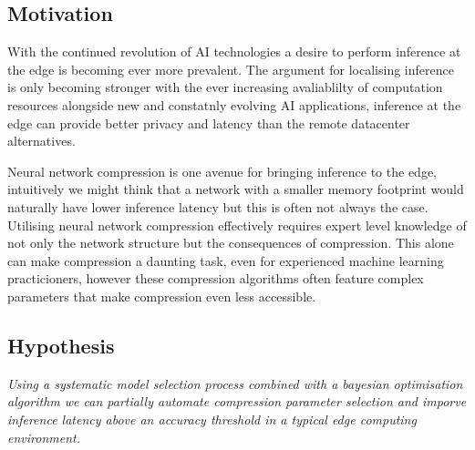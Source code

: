\documentclass[../D1.tex]{subfiles}
\begin{document}
\subsection{Motivation}
With the continued revolution of AI technologies a desire to perform inference at the edge is becoming ever more prevalent.
The argument for localising inference is only becoming stronger with the ever increasing avaliablilty of computation resources alongside new and constatnly evolving AI applications, inference at the edge can provide better privacy and latency than the remote datacenter alternatives.


Neural network compression is one avenue for bringing inference to the edge, intuitively we might think that a network with a smaller memory footprint would naturally have lower inference latency but this is often not always the case.
Utilising neural network compression effectively requires expert level knowledge of not only the network structure but the consequences of compression.
This alone can make compression a daunting task, even for experienced machine learning practicioners, however these compression algorithms often feature complex parameters that make compression even less accessible.

\subsection{Hypothesis}
\emph{Using a systematic model selection process combined with a bayesian optimisation algorithm we can partially automate compression parameter selection and imporve inference latency above an accuracy threshold in a typical edge computing environment.}

\newpage
\end{document}
